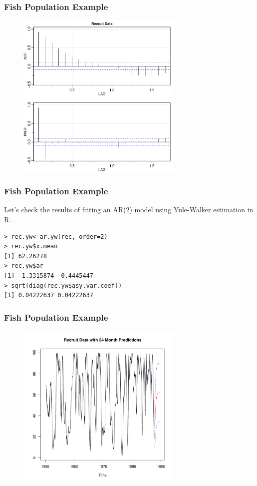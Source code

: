 \documentclass[%
xcolor=pdftex]{beamer}
\begin{document}
\begin{frame}
\frametitle{Fish Population Example}

\includegraphics[width=100mm, height=80mm]{recruit.pdf}

\end{frame}

\begin{frame}[fragile]
\frametitle{Fish Population Example}

Let's check the results of fitting an AR(2) model using Yule-Walker estimation in R.

\begin{verbatim}
> rec.yw<-ar.yw(rec, order=2)
> rec.yw$x.mean
[1] 62.26278
> rec.yw$ar
[1]  1.3315874 -0.4445447
> sqrt(diag(rec.yw$asy.var.coef))
[1] 0.04222637 0.04222637
\end{verbatim}

\end{frame}

\begin{frame}
\frametitle{Fish Population Example}

\includegraphics[width=100mm, height=80mm]{pred.pdf}

\end{frame}
\end{document}

